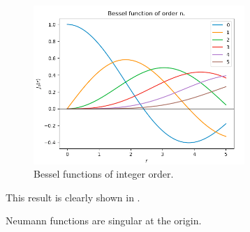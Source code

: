 %
\begin{figure} \centering
  \includegraphics[width=8cm]{../figures/plot_bessel_int_order}
  \caption{Bessel functions of integer order.}\label{fig:bessel_int_problem}
\end{figure}\par
%
This result is clearly shown in .
%
  \begin{propn}\label{propn:neumann_singular_at_origin}
    Neumann functions are singular at the origin.
  \end{propn}
